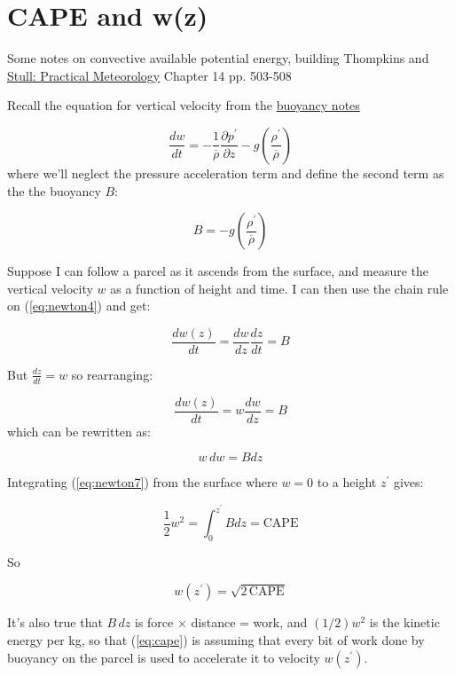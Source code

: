 \documentclass[12pt]{article}
\begin{document}
\newcommand{\vect}[1]{\boldsymbol{\vec{#1}}}
\pagestyle{first}


\section{CAPE and w(z)}
\label{sec:cape}

Some notes on convective available potential energy, building Thompkins and \href{https://www.eoas.ubc.ca/books/Practical_Meteorology/}{Stull: Practical Meteorology}
Chapter 14 pp. 503-508

Recall the equation for vertical velocity from the \href{https://www.dropbox.com/scl/fi/ygb2bi2riqo23ostxo8lw/buoyancy.pdf?rlkey=b80rbwtzartk4qp5dt9gjvsf6&dl=0}{buoyancy notes}

\begin{equation}
  \label{eq:newton4}
 \frac{dw}{dt} = -\frac{1}{\overline{\rho}} \frac{\partial p^\prime}{\partial z}
- g \left ( \frac{\rho^\prime}{\overline{\rho}} \right )
\end{equation}
where we'll neglect the pressure acceleration term and define the second term as the
the buoyancy $B$:

\begin{equation}
  \label{eq:buoyancy}
  B = - g \left ( \frac{\rho^\prime}{\overline{\rho}} \right )
\end{equation}

Suppose I can follow a parcel as it ascends from the surface, and measure the vertical velocity $w$ as a function of height and time.   I can then use the chain rule on (\ref{eq:newton4}) and get:

\begin{equation}
  \label{eq:newton5}
 \frac{dw(z)}{dt} = \frac{dw}{dz} \frac{dz}{dt} = B
\end{equation}


But $\frac{dz}{dt} = w$ so rearranging:

\begin{equation}
  \label{eq:newton6}
 \frac{dw(z)}{dt} = w \frac{dw}{dz} = B
\end{equation}
which can be rewritten as:

\begin{equation}
  \label{eq:newton7}
  w\,dw  = B dz
\end{equation}

Integrating (\ref{eq:newton7}) from the surface where $w = 0$ to a height $z^\prime$ gives:

\begin{equation}
  \label{eq:newton7}
  \frac{1}{2} w^2 =  \int_0^{z^\prime} B dz = \text{CAPE}
\end{equation}

So

\begin{equation}
  \label{eq:cape}
  w(z^\prime) =  \sqrt{2\,\text{CAPE}}
\end{equation}

It's also true that $B\,dz$ is force $\times$ distance = work,  and $(1/2) w^2$ is the kinetic energy per kg, so that (\ref{eq:cape}) is assuming that every bit of work done by buoyancy on the parcel is used to accelerate it to velocity $w(z^\prime)$.
\end{document}
